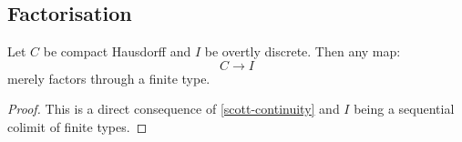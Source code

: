 \subsection{Factorisation}

\begin{theorem}[Factorisation]
Let $C$ be compact Hausdorff and $I$ be overtly discrete. Then any map:
\[C\to I\]
merely factors through a finite type.
\end{theorem}

\begin{proof}
This is a direct consequence of \cref{scott-continuity} and $I$ being a sequential colimit of finite types.
\end{proof}



